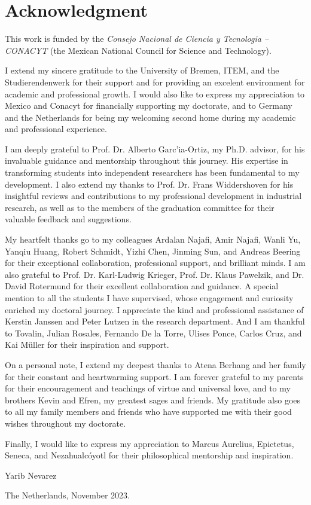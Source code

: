 \chapter*{Acknowledgment}
\thispagestyle{empty}
This work is funded by the \textit{Consejo Nacional de Ciencia y Tecnologia -- CONACYT} (the Mexican National Council for Science and Technology).

I extend my sincere gratitude to the University of Bremen, ITEM, and the Studierendenwerk for their support and for providing an excelent environment for academic and professional growth. I would also like to express my appreciation to Mexico and Conacyt for financially supporting my doctorate, and to Germany and the Netherlands for being my welcoming second home during my academic and professional experience.

I am deeply grateful to Prof. Dr. Alberto Garc'ia-Ortiz, my Ph.D. advisor, for his invaluable guidance and mentorship throughout this journey. His expertise in transforming students into independent researchers has been fundamental to my development. I also extend my thanks to Prof. Dr. Frans Widdershoven for his insightful reviews and contributions to my professional development in industrial research, as well as to the members of the graduation committee for their valuable feedback and suggestions.

My heartfelt thanks go to my colleagues Ardalan Najafi, Amir Najafi, Wanli Yu, Yanqiu Huang, Robert Schmidt, Yizhi Chen, Jinming Sun, and Andreas Beering for their exceptional collaboration, professional support, and brilliant minds. I am also grateful to Prof. Dr. Karl-Ludwig Krieger, Prof. Dr. Klaus Pawelzik, and Dr. David Rotermund for their excellent collaboration and guidance. A special mention to all the students I have supervised, whose engagement and curiosity enriched my doctoral journey. I appreciate the kind and professional assistance of Kerstin Janssen and Peter Lutzen in the research department. And I am thankful to Tovalin, Julian Rosales, Fernando De la Torre, Ulises Ponce, Carlos Cruz, and Kai M\"uller for their inspiration and support.

On a personal note, I extend my deepest thanks to Atena Berhang and her family for their constant and heartwarming support. I am forever grateful to my parents for their encouragement and teachings of virtue and universal love, and to my brothers Kevin and Efren, my greatest sages and friends. My gratitude also goes to all my family members and friends who have supported me with their good wishes throughout my doctorate.

Finally, I would like to express my appreciation to Marcus Aurelius, Epictetus, Seneca, and Nezahualc\'oyotl for their philosophical mentorship and inspiration.

Yarib Nevarez

The Netherlands, November 2023.

